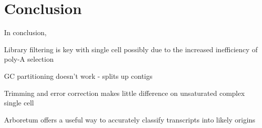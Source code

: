 %



\section{Conclusion}
In conclusion,

Library filtering is key with single cell possibly due to the increased inefficiency of poly-A selection

GC partitioning doesn't work - splits up contigs

Trimming and error correction makes little difference on unsaturated complex single cell 

Arboretum offers a useful way to accurately classify transcripts into likely origins 




